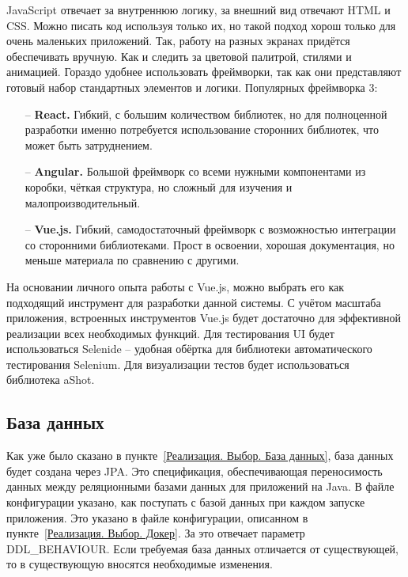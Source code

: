\documentclass[a4paper,article]{article}
\begin{document}
\begin{sloppypar}
    JavaScript отвечает за внутреннюю логику, за внешний вид отвечают HTML и CSS. Можно писать код используя только их, но такой подход хорош только для очень маленьких приложений. Так, работу на разных экранах придётся обеспечивать вручную. Как и следить за цветовой палитрой, стилями и анимацией. Гораздо удобнее использовать фреймворки, так как они представляют готовый набор стандартных элементов и логики. Популярных фреймворка 3:

        \begin{itemize}[nolistsep]
        \item[--] \textbf{React.} Гибкий, с большим количеством библиотек, но для полноценной разработки именно потребуется использование сторонних библиотек, что может быть затруднением.
        \item[--] \textbf{Angular.} Большой фреймворк со всеми нужными компонентами из коробки, чёткая структура, но сложный для изучения и малопроизводительный.
        \item[--] \textbf{Vue.js.} Гибкий, самодостаточный фреймворк с возможностью интеграции со сторонними библиотеками. Прост в освоении, хорошая документация, но меньше материала по сравнению с другими.
    \end{itemize}

    На основании личного опыта работы с Vue.js, можно выбрать его как подходящий инструмент для разработки данной системы. С учётом масштаба приложения, встроенных инструментов Vue.js будет достаточно для эффективной реализации всех необходимых функций. Для тестирования UI будет использоваться Selenide -- удобная обёртка для библиотеки автоматического тестирования Selenium. Для визуализации тестов будет использоваться библиотека aShot.

    \subsection{База данных}\label{Реализация. База данных}

    Как уже было сказано в пункте~\ref{Реализация. Выбор. База данных}, база данных будет создана через JPA. Это спецификация, обеспечивающая переносимость данных между реляционными базами данных для приложений на Java. В файле конфигурации указано, как поступать с базой данных при каждом запуске приложения. Это указано в файле конфигурации, описанном в пункте~\ref{Реализация. Выбор. Докер}. За это отвечает параметр {DDL\_BEHAVIOUR}. Если требуемая база данных отличается от существующей, то в существующую вносятся необходимые изменения.


\end{sloppypar}
\end{document}
